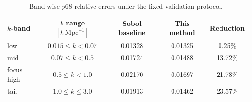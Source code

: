 \begin{table}[t]
\centering
\caption{Band-wise \(p68\) relative errors under the fixed validation protocol.}
\label{tab:band_p68}
\begin{tabular}{lcccc}
\toprule
\(k\)-band & \(k\) range \([h\,\mathrm{Mpc}^{-1}]\) & Sobol baseline & This method & Reduction \\
\midrule
low & $0.015 \leq k < 0.07$ & 0.01328 & 0.01325 & 0.25\% \\
mid & $0.07 \leq k < 0.5$ & 0.01724 & 0.01488 & 13.72\% \\
focus high & $0.5 \leq k < 1.0$ & 0.02170 & 0.01697 & 21.78\% \\
tail & $1.0 \leq k \leq 3.0$ & 0.01913 & 0.01462 & 23.57\% \\
\bottomrule
\end{tabular}
\end{table}
